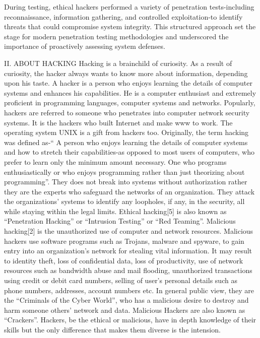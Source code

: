During testing, ethical hackers performed a variety of penetration tests-including reconnaissance, information gathering, and controlled exploitation-to identify threats that could compromise system integrity. This structured approach set the stage for modern penetration testing methodologies and underscored the importance of proactively assessing system defenses.

II. ABOUT HACKING  
Hacking is a brainchild of curiosity. As a result of 
curiosity, the hacker always wants to know more about 
information, depending upon his taste. A hacker is a person 
who enjoys learning the details of computer systems and 
enhances his capabilities. He is a computer enthusiast and 
extremely proficient in programming languages, computer 
systems and networks. Popularly, hackers are referred to 
someone who penetrates into computer network security 
systems. It is the hackers who built Internet and make www 
to work. The operating system UNIX is a gift from hackers 
too. Originally, the term hacking was defined as-“ A person 
who enjoys learning the details of computer systems and 
how to stretch their capabilities-as opposed to most users of 
computers, who prefer to learn only the minimum amount 
necessary. One who programs enthusiastically or who 
enjoys programming rather than just theorizing about 
programming”.  
They does not break into systems without authorization 
rather they are the experts who safeguard the networks of 
an organization. They attack the organizations’ systems to 
identify any loopholes, if any, in the security, all while 
staying within the legal limits. Ethical hacking[5] is also 
known as “Penetration Hacking” or “Intrusion Testing” or 
“Red Teaming”. Malicious hacking[2] is the unauthorized 
use of computer and network resources. Malicious hackers 
use software programs such as Trojans, malware and 
spyware, to gain entry into an organization’s network for 
stealing vital information. It may result to identity theft, 
loss of confidential data, loss of productivity, use of 
network resources such as bandwidth abuse and mail 
flooding, unauthorized transactions using credit or debit 
card numbers, selling of user’s personal details such as 
phone numbers, addresses, account numbers etc. In general 
public view, they are the “Criminals of the Cyber World”, 
who has a malicious desire to destroy and harm someone 
others’ network and data. Malicious Hackers are also 
known as “Crackers”. Hackers, be the ethical or malicious, 
have in depth knowledge of their skills but the only 
difference that makes them diverse is the intension.  
